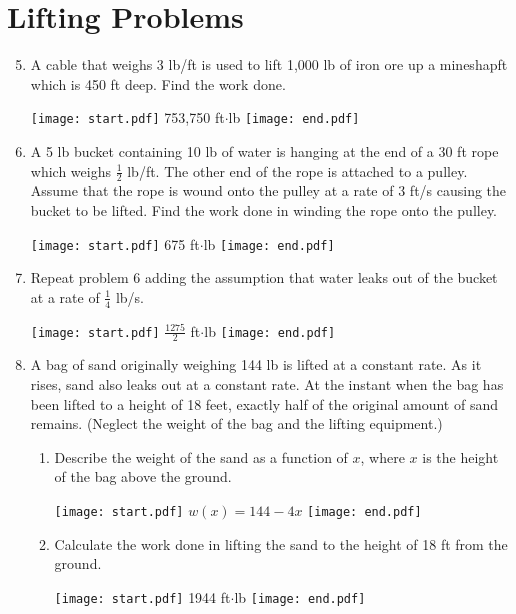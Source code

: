 \documentclass[12pt]{article}
\begin{document}
\section*{Lifting Problems}

\begin{enumerate}
\setcounter{enumi}{4}
\item A cable that weighs 3 lb/ft is used to lift 1,000 lb of iron ore up a mineshapft which is 450 ft deep.  Find the work done.

\texttt{[image: start.pdf]}
{{753,750 ft$\cdot$lb}}
\texttt{[image: end.pdf]}


\item A 5 lb bucket containing 10 lb of water is hanging at the end of a 30 ft rope which weighs $\frac{1}{2}$ lb/ft.  The other end of the rope is attached to a pulley.  Assume that the rope is wound onto the pulley at a rate of 3 ft/s causing the bucket to be lifted. Find the work done in winding the rope onto the pulley.

\texttt{[image: start.pdf]}
{{675 ft$\cdot$lb}}
\texttt{[image: end.pdf]}


\item Repeat problem 6 adding the assumption that water leaks out of the bucket at a rate of $\frac{1}{4}$ lb/s.

\texttt{[image: start.pdf]}
{{$\frac{1275}{2}$ ft$\cdot$lb}}
\texttt{[image: end.pdf]}


\item A bag of sand originally weighing 144 lb is lifted at a constant rate.  As it rises, sand also leaks out at a constant rate.  At the instant when the bag has been lifted to a height of 18 feet, exactly half of the original amount of sand remains.  (Neglect the weight of the bag and the lifting equipment.)

\begin{enumerate}

\item Describe the weight of the sand as a function of $x$, where $x$ is the height of the bag above the ground.

\texttt{[image: start.pdf]}
{{$w(x)=144-4x$}}
\texttt{[image: end.pdf]}


\item Calculate the work done in lifting the sand to the height of 18 ft from the ground.

\texttt{[image: start.pdf]}
{{1944 ft$\cdot$lb}}
\texttt{[image: end.pdf]}


\end{enumerate}

\end{enumerate}
\end{document}
